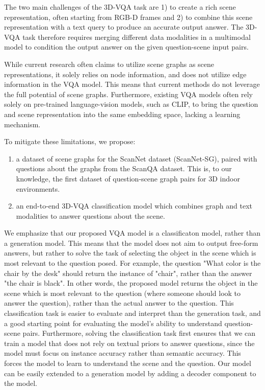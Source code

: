 The two main challenges of the 3D-VQA task are 1) to create a rich scene representation, often starting from RGB-D frames and 2) to combine this scene representation with a text query to produce an accurate output answer. The 3D-VQA task therefore requires merging different data modalities in a multimodal model to condition the output answer on the given question-scene input pairs.

While current research often claims to utilize scene graphs as scene representations, it solely relies on node information, and does not utilize edge information in the VQA model. This means that current methods do not leverage the full potential of scene graphs. Furthermore, existing VQA models often rely solely on pre-trained language-vision models, such as CLIP, to bring the question and scene representation into the same embedding space, lacking a learning mechanism.

To mitigate these limitations, we propose:
\begin{enumerate}
    \item a dataset of scene graphs for the ScanNet dataset (ScanNet-SG), paired with questions about the graphs from the ScanQA dataset. This is, to our knowledge, the first dataset of question-scene graph pairs for 3D indoor environments.
    \item an end-to-end 3D-VQA classification model which combines graph and text modalities to answer questions about the scene.
\end{enumerate}

We emphasize that our proposed VQA model is a classificaton model, rather than a generation model. This means that the model does not aim to output free-form answers, but rather to solve the task of selecting the object in the scene which is most relevant to the question posed. For example, the question "What color is the chair by the desk" should return the instance of "chair", rather than the answer "the chair is black". In other words, the proposed model returns the object in the scene which is most relevant to the question (where someone should look to answer the question), rather than the actual answer to the question. This classification task is easier to evaluate and interpret than the generation task, and a good starting point for evaluating the model's ability to understand question-scene pairs. Furthermore, solving the classification task first ensures that we can train a model that does not rely on textual priors to answer questions, since the model must focus on instance accuracy rather than semantic accuracy. This forces the model to learn to understand the scene and the question. Our model can be easily extended to a generation model by adding a decoder component to the model.

